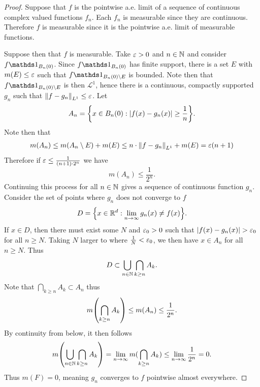 \documentclass[hw_all.tex]{subfiles}
\begin{document}
\begin{proof}
    Suppose that $f$ is the pointwise a.e. limit of a sequence of continuous complex valued functions $f_n$. Each $f_n$ is measurable since they are continuous. Therefore $f$ is measurable since it is the pointwise a.e. limit of measurable functions. 

    Suppose then that $f$ is measurable. Take $\varepsilon > 0$ and $n \in \mathbb{N}$ and consider $f \ind{B_n(0)}$. Since $f \ind{B_n(0)}$ has finite support, there is a set $E$ with $m(E) \leq \varepsilon$ such that $f \ind{B_n(0) \setminus E}$ is bounded. Note then that $f \ind{B_n(0) \setminus E}$ is then $\mathcal{L}^1$, hence there is a continuous, compactly supported $g_n$ such that $\norm{f - g_n}_{L^1} \leq \varepsilon$. Let
    \[
        A_n = \qty{x \in B_n(0) : |f(x) - g_n(x)| \geq \frac{1}{n}}
    .\]
    Note then that
    \begin{align*}
        m(A_n) \leq m(A_n \setminus E) + m(E) \leq n \cdot \norm{f - g_n}_{L^1} + m(E) = \varepsilon (n + 1)
    \end{align*}
    Therefore if $\varepsilon \leq \frac{1}{(n+1)\cdot 2^n}$ we have
    \[
        m(A_n) \leq \frac{1}{2^n}
    .\]
    Continuing this process for all $n \in \mathbb{N}$ gives a sequence of continuous function $g_n$. Consider the set of points where $g_n$ does not converge to $f$
    \[
        D = \qty{x \in \mathbb{R}^d : \lim_{n \to \infty} g_n(x) \neq f(x)}
    .\]
    If $x \in D$, then there must exist some $N$ and $\varepsilon_0 > 0$ such that $|f(x) - g_n(x)| > \varepsilon_0$ for all $n \geq N$. Taking $N$ larger to where $\frac{1}{N} < \varepsilon_0$, we then have $x \in A_n$ for all $n \geq N$. Thus
    \[
        D \subset \bigcup_{n \in \mathbb{N}} \bigcap_{k \geq n} A_k
    .\]
    Note that $\bigcap_{k \geq n} A_k \subset A_n$ thus
    \[
        m\qty(\bigcap_{k \geq n} A_k) \leq m(A_n) \leq \frac{1}{2^n}
    .\]
    By continuity from below, it then follows
    \[
        m\qty(\bigcup_{n \in \mathbb{N}} \bigcap_{k \geq n} A_k) = \lim_{n \to \infty} m(\bigcap_{k \geq n} A_k) \leq \lim_{n \to \infty} \frac{1}{2^n} = 0
    .\]
    Thus $m(F) = 0$, meaning $g_n$ converges to $f$ pointwise almost everywhere.
\end{proof}
\end{document}
